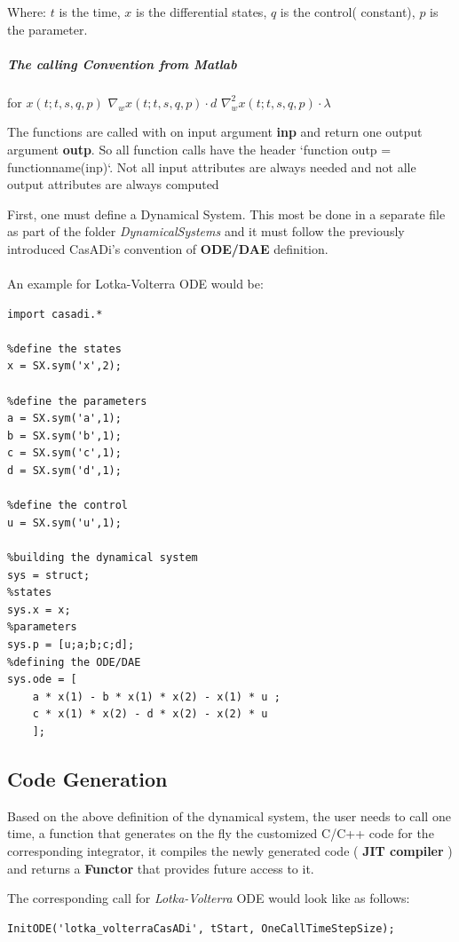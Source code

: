 \documentclass[12pt, letterpaper]{article}
\begin{document}
Where:
$t$ is the time,
$x$ is the differential states,
$q$ is the control( constant),
$p$ is the parameter.
\\
\subparagraph{The calling Convention from Matlab} for
\boldmath$x(t;t,s,q,p)$   
\boldmath$\nabla_{w} x(t;t,s,q,p)\cdot d$   
\boldmath$\nabla^2_{w} x(t;t,s,q,p) \cdot \lambda$
        

The functions are called with on input argument \textbf{inp} and return one output argument \textbf{outp}. So all function calls have the header `function outp = functionname(inp)`. Not all input attributes are always needed and not alle output attributes are always computed


First, one must define a Dynamical System. This most be done in a separate file as part of the folder  \textit{DynamicalSystems} and it must follow the previously introduced CasADi's convention of \textbf{ODE/DAE} definition. 
\\
\\
An example for Lotka-Volterra ODE would be:

\begin{lstlisting}
import casadi.*

%define the states
x = SX.sym('x',2);

%define the parameters
a = SX.sym('a',1);
b = SX.sym('b',1);
c = SX.sym('c',1);
d = SX.sym('d',1);

%define the control
u = SX.sym('u',1);

%building the dynamical system
sys = struct;
%states
sys.x = x;
%parameters
sys.p = [u;a;b;c;d];
%defining the ODE/DAE
sys.ode = [ 
    a * x(1) - b * x(1) * x(2) - x(1) * u ; 
    c * x(1) * x(2) - d * x(2) - x(2) * u 
    ];
\end{lstlisting}

\subsection{Code Generation}

Based on the above definition of the dynamical system, the user needs to call one time, a function that generates on the fly the customized C/C++ code for the corresponding integrator, it compiles the newly generated code ( \textbf{JIT compiler} ) and returns a \textbf{Functor} that provides future access to it.

The corresponding call for \textit{Lotka-Volterra} ODE would look like as follows:

\begin{lstlisting}
InitODE('lotka_volterraCasADi', tStart, OneCallTimeStepSize);
\end{lstlisting}
\end{document}

